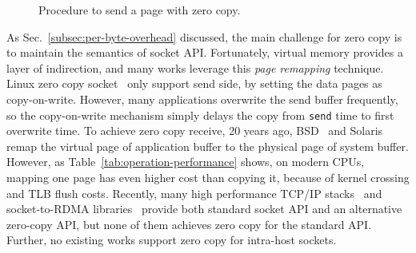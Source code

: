 \begin{figure}[t]
	\centering
	\hspace{0.02\textwidth}
	\vspace{-10pt}
	\caption{Procedure to send a page with zero copy.}
\end{figure}



As Sec.~\ref{subsec:per-byte-overhead} discussed, the main challenge for zero copy is to maintain the semantics of socket API.
Fortunately, virtual memory provides a layer of indirection, and many works leverage this \emph{page remapping} technique.
Linux zero copy socket~\cite{linux-zero-copy} only support send side, by setting the data pages as copy-on-write.
However, many applications overwrite the send buffer frequently, so the copy-on-write mechanism simply delays the copy from \texttt{send} time to first overwrite time. 
To achieve zero copy receive, 20 years ago, BSD~\cite{thadani1995efficient} and Solaris~\cite{chu1996zero} remap the virtual page of application buffer to the physical page of system buffer. However, as Table~\ref{tab:operation-performance} shows, on modern CPUs, mapping one page has even higher cost than copying it, because of kernel crossing and TLB flush costs.
Recently, many high performance TCP/IP stacks~\cite{han2012megapipe,yasukata2016stackmap} and socket-to-RDMA libraries~\cite{rsockets,socketsdirect} provide both standard socket API and an alternative zero-copy API, but none of them achieves zero copy for the standard API.
Further, no existing works support zero copy for intra-host sockets.


